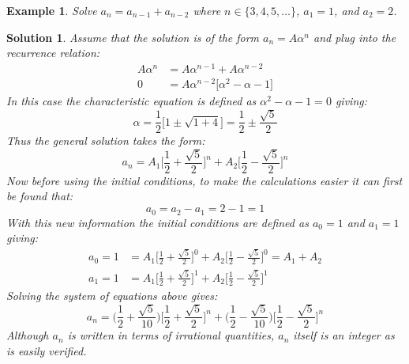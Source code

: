 \documentclass[12pt, letterpaper, onecolumn, conference, final]{IEEEtran}
\theoremstyle{definition}
\theoremstyle{plain}
\newtheorem{example}{Example}[section]
\newtheorem{solution}{Solution}[section]
\begin{document}
\begin{example}
Solve $a_n=a_{n-1}+a_{n-2}$ where $n \in \{3,4,5,\dots\}$, $a_1=1$, and $a_2=2$.
\end{example}
\begin{solution}
Assume that the solution is of the form $a_n=A\alpha^n$ and plug into the recurrence relation:
\begin{equation*}
\begin{split}
A\alpha^n &= A\alpha^{n-1} + A\alpha^{n-2} \\
0 &= A\alpha^{n-2} \Big[ \alpha^2 - \alpha - 1 \Big]
\end{split}
\end{equation*}
In this case the characteristic equation is defined as $\alpha^2 - \alpha - 1 = 0$ giving:
\begin{equation*}
\alpha = \frac{1}{2} \Big[ 1 \pm \sqrt{1+4} \Big] = \frac{1}{2} \pm \frac{\sqrt{5}}{2}
\end{equation*}
Thus the general solution takes the form:
\begin{equation*}
a_n = A_1\Big[ \frac{1}{2} + \frac{\sqrt{5}}{2} \Big]^n + A_2\Big[ \frac{1}{2} - \frac{\sqrt{5}}{2} \Big]^n
\end{equation*}
Now before using the initial conditions, to make the calculations easier it can first be found that:
\begin{equation*}
a_0 = a_2 - a_1 = 2 - 1 = 1
\end{equation*}
With this new information the initial conditions are defined as $a_0=1$ and $a_1=1$ giving:
\begin{equation*}
\begin{split}
a_0 = 1 &= A_1\Big[ \frac{1}{2} + \frac{\sqrt{5}}{2} \Big]^0 + A_2\Big[ \frac{1}{2} - \frac{\sqrt{5}}{2} \Big]^0 = A_1 + A_2 \\
a_1 = 1 &= A_1\Big[ \frac{1}{2} + \frac{\sqrt{5}}{2} \Big]^1 + A_2\Big[ \frac{1}{2} - \frac{\sqrt{5}}{2} \Big]^1
\end{split}
\end{equation*}
Solving the system of equations above gives:
\begin{equation*}
a_n = \Big( \frac{1}{2} + \frac{\sqrt{5}}{10} \Big) \Big[ \frac{1}{2} + \frac{\sqrt{5}}{2} \Big]^n + \Big( \frac{1}{2} - \frac{\sqrt{5}}{10} \Big) \Big[ \frac{1}{2} - \frac{\sqrt{5}}{2} \Big]^n
\end{equation*}
Although $a_n$ is written in terms of irrational quantities, $a_n$ itself is an integer as is easily verified.
\end{solution}
\end{document}
